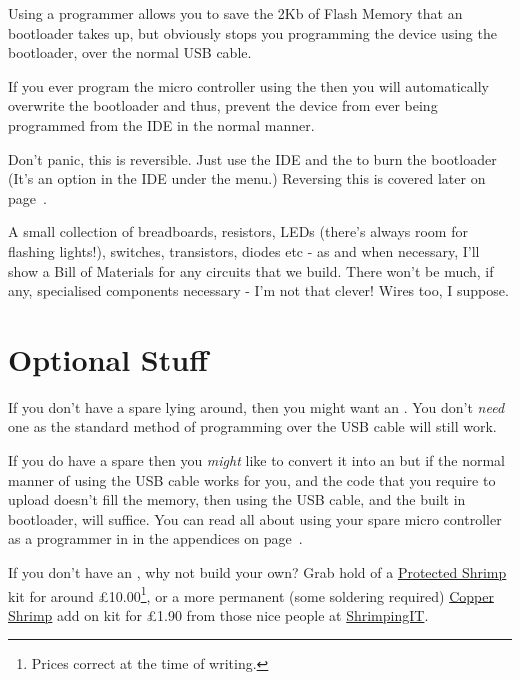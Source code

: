 Using a programmer allows you to save the 2Kb of Flash Memory that an   bootloader takes up, but obviously stops you programming the device using the bootloader, over the normal USB cable.

\begin{note}
	If you ever program the micro controller using the  then you will automatically overwrite the bootloader and thus, prevent the device from ever being programmed from the  IDE in the normal manner.
	
	Don't panic, this is reversible. Just use the  IDE and the  to burn the bootloader (It's an option in the IDE under the  menu.) Reversing this is covered later on page~\pageref{reburn-the-bootloader}.
\end{note}	

A small collection of breadboards, resistors, LEDs (there's always room for flashing lights!), switches, transistors, diodes etc - as and when necessary, I'll show a Bill of Materials for any circuits that we build. There won't be much, if any, specialised components necessary - I'm not that clever! Wires too, I suppose.

\section*{Optional Stuff}\label{optional-stuff}

If you don't have a spare   lying around, then you might want an . You don't \emph{need} one as the standard   method of programming over the USB cable will still work.

If you do have a spare  then you \emph{might} like to convert it into an  but if the normal manner of using the USB cable works for you, and the code that you require to upload doesn't fill the memory, then using the USB cable, and the built in  bootloader, will suffice. You can read all about using your spare micro controller as a programmer in  in the appendices on page~\pageref{using-an-arduino-as-an-isp-programmer}.

If you don't have an , why not build your own? Grab hold of a \href{http://start.shrimping.it/project/protected/build.html}{Protected Shrimp} kit for around £10.00\footnote{Prices correct at the time of writing.}, or a more permanent (some soldering required) \href{http://start.shrimping.it/kit/stripboard.html}{Copper Shrimp} add on kit for £1.90 from those nice people at \href{http://start.shrimping.it//index.html}{ShrimpingIT}. 

